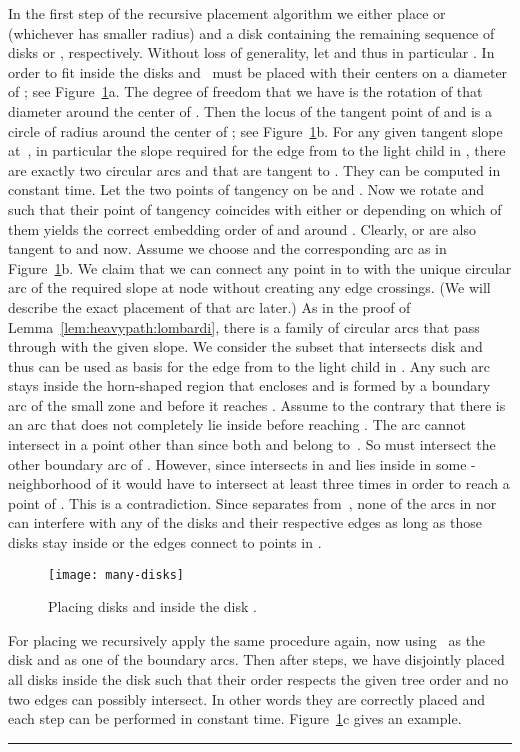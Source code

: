 \documentclass[11pt]{article}
\newcommand{\qed}{\hspace*{\fill}\rule{6pt}{6pt}}
\newenvironment{proof}{\noindent{\bf Proof:}}{\bigskip} \makeatletter
\begin{document}
\begin{proof}
  In the first step of the recursive placement algorithm we either
  place  or  (whichever has smaller radius) and a disk
   containing the remaining sequence of disks  or , respectively. Without loss of
  generality, let  and thus in particular . In order to fit inside  the disks  and~ must
  be placed with their centers on a diameter of ; see
  Figure~\ref{fig:many-disks}a. The degree of freedom that we have is
  the rotation of that diameter around the center of . Then the
  locus of the tangent point of  and  is a circle 
  of radius  around the center of ; see
  Figure~\ref{fig:many-disks}b. For any given tangent slope at~, in particular the slope required for the edge from  to the light child in , there are exactly two circular arcs
   and  that are tangent to . 
	They can be computed in constant time. 
	Let the two points of tangency on  be  and . 
	Now we rotate  and  such that their point of tangency coincides with either  or  depending on which of them yields the correct  embedding order of  and  around . 
	Clearly,  or  are also tangent to  and  now. 
	Assume we choose  and the corresponding arc  as in Figure~\ref{fig:many-disks}b. 
  We claim that we can connect any point in  to  with the unique circular arc of the required slope at node  without creating any edge crossings. 
	(We will describe the exact placement of that arc later.)
  As in the proof of Lemma~\ref{lem:heavypath:lombardi}, there is a family  of circular arcs that pass through  with the given slope.
	We consider the subset  that intersects disk  and thus can be used as basis for the edge from  to the light child in . 
  Any such arc stays inside the horn-shaped region  that encloses  and is formed by a boundary arc  of the small zone and  before it reaches . 
  Assume to the contrary that there is an arc  that does not completely lie inside  before reaching . 
	The arc  cannot intersect  in a point other than  since both  and  belong to~.
	So  must intersect the other boundary arc  of . 
	However, since  intersects  in  and lies inside  in some -neighborhood of  it would have to intersect  at least three times in order to reach a point of .
	This is a contradiction. 
	Since  separates  from~, none of the arcs in  nor  can interfere with any of the disks  and their respective edges as long as those disks stay inside 
  or the edges connect to points in .
  \begin{figure}[tb]
    \centering
    \texttt{[image: many-disks]}
    \caption{Placing disks  and  inside the disk .}
    \label{fig:many-disks}
  \end{figure}

  For placing  we recursively apply the same
  procedure again, now using~ as the disk  and  as one
  of the boundary arcs. Then after  steps, we have disjointly
  placed all disks  inside the disk  such that
  their order respects the given tree order and no two edges can possibly
  intersect. In other words they are correctly placed and each step can be performed in constant time.
	Figure~\ref{fig:many-disks}c gives an example. \qed
\end{proof}
\end{document}
